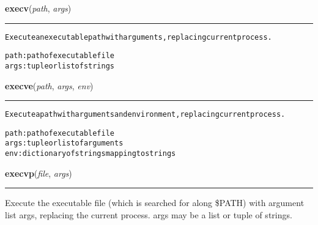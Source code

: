     \label{os:execv}

    \vspace{0.5ex}

\hspace{.8\funcindent}\begin{boxedminipage}{\funcwidth}

    \raggedright \textbf{execv}(\textit{path}, \textit{args})

    \vspace{-1.5ex}

    \rule{\textwidth}{0.5\fboxrule}
\setlength{\parskip}{2ex}
\begin{alltt}
Execute an executable path with arguments, replacing current process.

    path: path of executable file
    args: tuple or list of strings
\end{alltt}

\setlength{\parskip}{1ex}
    \end{boxedminipage}

    \label{os:execve}

    \vspace{0.5ex}

\hspace{.8\funcindent}\begin{boxedminipage}{\funcwidth}

    \raggedright \textbf{execve}(\textit{path}, \textit{args}, \textit{env})

    \vspace{-1.5ex}

    \rule{\textwidth}{0.5\fboxrule}
\setlength{\parskip}{2ex}
\begin{alltt}
Execute a path with arguments and environment, replacing current process.

    path: path of executable file
    args: tuple or list of arguments
    env: dictionary of strings mapping to strings
\end{alltt}

\setlength{\parskip}{1ex}
    \end{boxedminipage}

    \label{os:execvp}

    \vspace{0.5ex}

\hspace{.8\funcindent}\begin{boxedminipage}{\funcwidth}

    \raggedright \textbf{execvp}(\textit{file}, \textit{args})

    \vspace{-1.5ex}

    \rule{\textwidth}{0.5\fboxrule}
\setlength{\parskip}{2ex}
    Execute the executable file (which is searched for along \$PATH) with 
    argument list args, replacing the current process. args may be a list 
    or tuple of strings.

\setlength{\parskip}{1ex}
    \end{boxedminipage}

